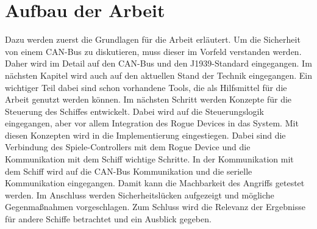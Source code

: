 \section{Aufbau der Arbeit}
Dazu werden zuerst die Grundlagen für die Arbeit erläutert. 
Um die Sicherheit von einem CAN-Bus zu diskutieren, muss dieser im Vorfeld verstanden werden. Daher wird
im Detail auf den CAN-Bus und den J1939-Standard eingegangen.
Im nächsten Kapitel wird auch auf den aktuellen Stand der Technik eingegangen.
Ein wichtiger Teil dabei sind schon vorhandene Tools, die als Hilfsmittel für die Arbeit genutzt werden können.
Im nächsten Schritt werden Konzepte für die Steuerung des Schiffes entwickelt. Dabei wird auf die Steuerungslogik eingegangen, aber
vor allem Integration des Rogue Devices in das System. Mit diesen Konzepten wird in die Implementierung eingestiegen. Dabei sind 
die Verbindung des Spiele-Controllers mit dem Rogue Device und die Kommunikation mit dem Schiff wichtige Schritte.
In der Kommunikation mit dem Schiff wird auf die CAN-Bus Kommunikation und die serielle Kommunikation eingegangen.
Damit kann die Machbarkeit des Angriffs getestet werden. Im Anschluss werden Sicherheitslücken aufgezeigt und mögliche Gegenmaßnahmen
vorgeschlagen. Zum Schluss wird die Relevanz der Ergebnisse für andere Schiffe betrachtet und ein Ausblick gegeben. \\
